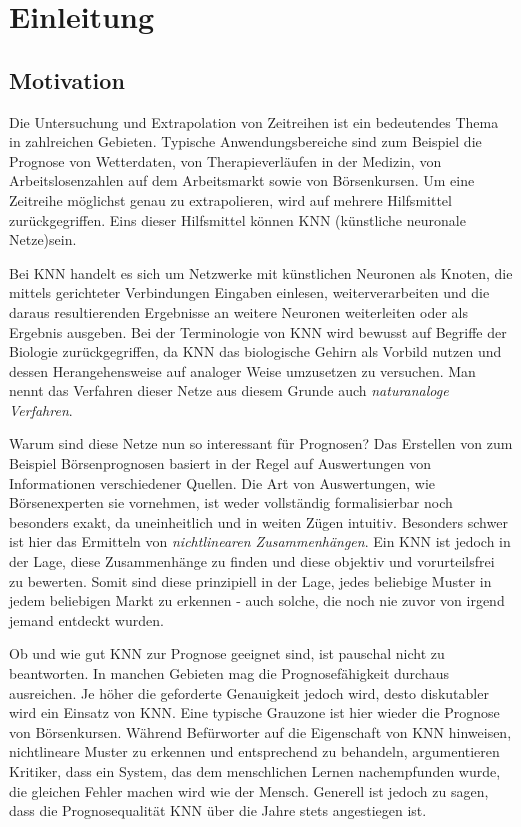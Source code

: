 \chapter{Einleitung}
\label{chapter:Einleitung}

\section{Motivation}
\label{section:Motivation}
Die Untersuchung und Extrapolation von Zeitreihen ist ein bedeutendes Thema in zahlreichen Gebieten. Typische Anwendungsbereiche sind zum Beispiel die Prognose von Wetterdaten, von Therapieverläufen in der  Medizin, von Arbeitslosenzahlen auf dem Arbeitsmarkt sowie von Börsenkursen. Um eine Zeitreihe möglichst genau zu extrapolieren, wird auf mehrere Hilfsmittel zurückgegriffen. Eins dieser Hilfsmittel können KNN (künstliche neuronale Netze)sein. 

Bei KNN handelt es sich um Netzwerke mit künstlichen Neuronen als Knoten, die mittels gerichteter Verbindungen Eingaben einlesen, weiterverarbeiten und die daraus resultierenden Ergebnisse an weitere Neuronen weiterleiten oder als Ergebnis ausgeben. Bei der Terminologie von KNN wird bewusst auf Begriffe der Biologie zurückgegriffen, da KNN das biologische Gehirn als Vorbild nutzen und dessen Herangehensweise auf analoger Weise umzusetzen zu versuchen. Man nennt das Verfahren dieser Netze aus diesem Grunde auch \textit{naturanaloge Verfahren}.

Warum sind diese Netze nun so interessant für Prognosen? Das Erstellen von zum Beispiel Börsenprognosen basiert in der Regel auf Auswertungen von Informationen verschiedener Quellen. Die Art von Auswertungen, wie Börsenexperten sie vornehmen, ist weder vollständig formalisierbar noch besonders exakt, da uneinheitlich und in weiten Zügen intuitiv. Besonders schwer ist hier das Ermitteln von \textit{nichtlinearen Zusammenhängen}. Ein KNN ist jedoch in der Lage, diese Zusammenhänge zu finden  und diese objektiv und vorurteilsfrei zu bewerten. Somit sind diese prinzipiell in der Lage, jedes beliebige Muster in jedem beliebigen Markt zu erkennen - auch solche, die noch nie zuvor von irgend jemand entdeckt wurden.

Ob und wie gut KNN zur Prognose geeignet sind, ist pauschal nicht zu beantworten. In manchen Gebieten mag die Prognosefähigkeit durchaus ausreichen. Je höher die geforderte Genauigkeit jedoch wird, desto diskutabler wird ein Einsatz von KNN. Eine typische Grauzone ist hier wieder die Prognose von Börsenkursen. Während Befürworter auf die Eigenschaft von KNN hinweisen, nichtlineare Muster zu erkennen und entsprechend zu behandeln, argumentieren Kritiker, dass ein System, das dem menschlichen Lernen nachempfunden wurde, die gleichen Fehler machen wird wie der Mensch. Generell ist jedoch zu sagen, dass die Prognosequalität KNN über die Jahre stets angestiegen ist.

